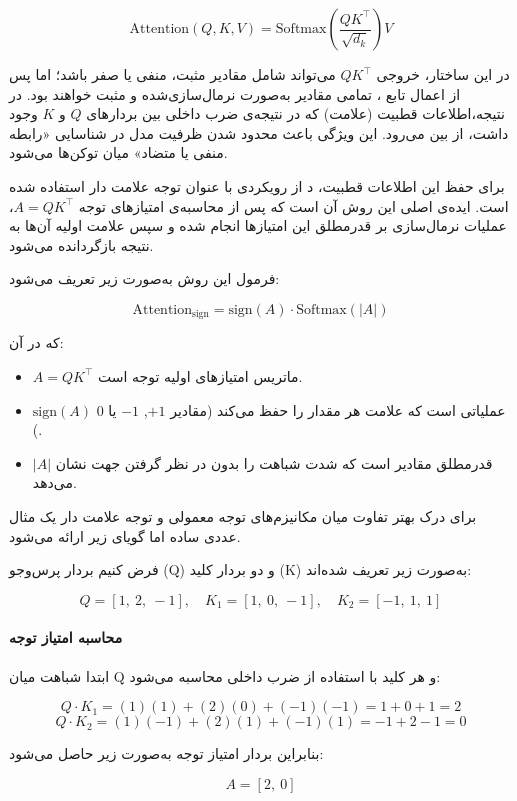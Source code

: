 \[
\text{Attention}(Q, K, V) = \text{Softmax}\left( \frac{QK^\top}{\sqrt{d_k}} \right) V
\]

در این ساختار، خروجی $QK^\top$ می‌تواند شامل مقادیر مثبت، منفی یا صفر باشد؛ اما پس از اعمال تابع ، تمامی مقادیر به‌صورت نرمال‌سازی‌شده و مثبت خواهند بود. در نتیجه،اطلاعات قطبیت (علامت) که در نتیجه‌ی ضرب داخلی بین بردارهای $Q$ و $K$ وجود داشت، از بین می‌رود. این ویژگی باعث محدود شدن ظرفیت مدل در شناسایی «رابطه منفی یا متضاد» میان توکن‌ها می‌شود.

برای حفظ این اطلاعات قطبیت، د از رویکردی با عنوان  توجه علامت دار استفاده شده است. ایده‌ی اصلی این روش آن است که پس از محاسبه‌ی امتیازهای توجه $A = QK^\top$، عملیات نرمال‌سازی  بر قدرمطلق این امتیازها انجام شده و سپس علامت اولیه آن‌ها به نتیجه بازگردانده می‌شود.

فرمول این روش به‌صورت زیر تعریف می‌شود:

\[
\text{Attention}_{\text{sign}} = \text{sign}(A) \cdot \text{Softmax}(|A|)
\]

که در آن:
\begin{itemize}
	\item $A = QK^\top$ ماتریس امتیازهای اولیه توجه است.
	\item $\text{sign}(A)$ عملیاتی است که علامت هر مقدار را حفظ می‌کند (مقادیر $+1$, $-1$ یا $0$).
	\item $|A|$ قدرمطلق مقادیر است که شدت شباهت را بدون در نظر گرفتن جهت نشان می‌دهد.
\end{itemize}


برای درک بهتر تفاوت میان مکانیزم‌های توجه معمولی و توجه علامت دار یک مثال عددی ساده اما گویای زیر ارائه می‌شود.

فرض کنیم  بردار پرس‌وجو (Q) و دو بردار کلید (K) به‌صورت زیر تعریف شده‌اند:

\[
Q = [1,\ 2,\ -1], \quad
K_1 = [1,\ 0,\ -1], \quad
K_2 = [-1,\ 1,\ 1]
\]

\paragraph{محاسبه امتیاز توجه}

ابتدا شباهت میان Q و هر کلید با استفاده از ضرب داخلی محاسبه می‌شود:

\[
Q \cdot K_1 = (1)(1) + (2)(0) + (-1)(-1) = 1 + 0 + 1 = 2
\]
\[
Q \cdot K_2 = (1)(-1) + (2)(1) + (-1)(1) = -1 + 2 -1 = 0
\]

بنابراین بردار امتیاز توجه به‌صورت زیر حاصل می‌شود:

\[
A = [2,\ 0]
\]

